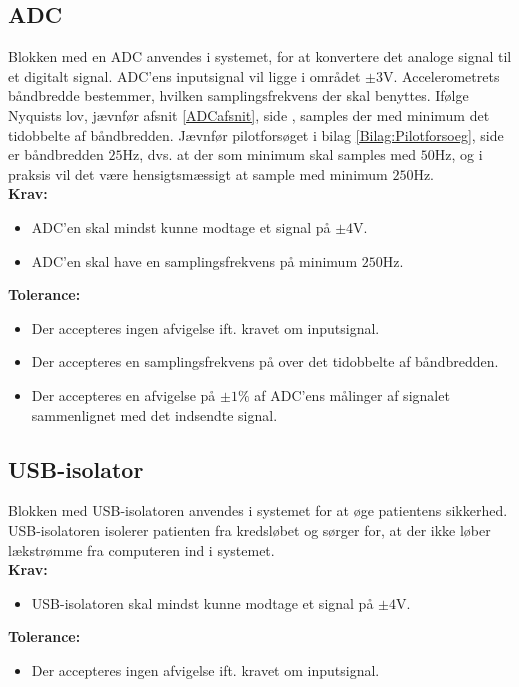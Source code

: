 \subsection{ADC}
Blokken med en ADC anvendes i systemet, for at konvertere det analoge signal til et digitalt signal. %
ADC'ens inputsignal vil ligge i området $\pm3$V. Accelerometrets båndbredde bestemmer, hvilken samplingsfrekvens der skal benyttes. Ifølge Nyquists lov, jævnfør afsnit \ref{ADCafsnit}, side \pageref{ADCafsnit}, samples der med minimum det tidobbelte af båndbredden. Jævnfør pilotforsøget i bilag \ref{Bilag:Pilotforsoeg}, side \pageref{Bilag:Pilotforsoeg} er båndbredden $25$Hz, dvs. at der som minimum skal samples med $50$Hz, og i praksis vil det være hensigtsmæssigt at sample med minimum $250$Hz. \\
\textbf{Krav:}
\begin{itemize}
	\item ADC'en skal mindst kunne modtage et signal på $\pm4$V.
	\item ADC'en skal have en samplingsfrekvens på minimum $250$Hz.
\end{itemize}
\textbf{Tolerance:}
\begin{itemize}
	\item Der accepteres ingen afvigelse ift. kravet om inputsignal.
	\item Der accepteres en samplingsfrekvens på over det tidobbelte af båndbredden.
	\item Der accepteres en afvigelse på $\pm1\%$ af ADC'ens målinger af signalet sammenlignet med det indsendte signal.
\end{itemize}
\subsection{USB-isolator}\label{kravspecifikationer_USB}
Blokken med USB-isolatoren anvendes i systemet for at øge patientens sikkerhed. USB-isolatoren isolerer patienten fra kredsløbet og sørger for, at der ikke løber lækstrømme fra computeren ind i systemet.\\
\textbf{Krav:}
\begin{itemize}
	\item USB-isolatoren skal mindst kunne modtage et signal på $\pm4$V.  
\end{itemize}
\textbf{Tolerance:} 
\begin{itemize}
	\item Der accepteres ingen afvigelse ift. kravet om inputsignal. 
\end{itemize}
